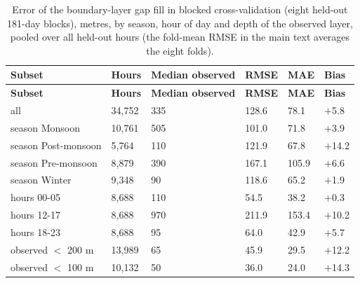 \begingroup\footnotesize
\begin{longtable}{L{4.4cm} C{1.4cm} C{2.0cm} C{1.4cm} C{1.4cm} C{1.4cm}}
\caption{Error of the boundary-layer gap fill in blocked cross-validation (eight held-out 181-day blocks), metres, by season, hour of day and depth of the observed layer, pooled over all held-out hours (the fold-mean RMSE in the main text averages the eight folds).}\label{tab:s-gapfill}\\
\toprule
\textbf{Subset} & \textbf{Hours} & \textbf{Median observed} & \textbf{RMSE} & \textbf{MAE} & \textbf{Bias} \\
\midrule\endfirsthead
\toprule
\textbf{Subset} & \textbf{Hours} & \textbf{Median observed} & \textbf{RMSE} & \textbf{MAE} & \textbf{Bias} \\
\midrule\endhead
\bottomrule\endfoot
all & 34,752 & 335 & 128.6 & 78.1 & $+$5.8 \\
season Monsoon & 10,761 & 505 & 101.0 & 71.8 & $+$3.9 \\
season Post-monsoon & 5,764 & 110 & 121.9 & 67.8 & $+$14.2 \\
season Pre-monsoon & 8,879 & 390 & 167.1 & 105.9 & $+$6.6 \\
season Winter & 9,348 & 90 & 118.6 & 65.2 & $+$1.9 \\
hours 00-05 & 8,688 & 110 & 54.5 & 38.2 & $+$0.3 \\
hours 12-17 & 8,688 & 970 & 211.9 & 153.4 & $+$10.2 \\
hours 18-23 & 8,688 & 95 & 64.0 & 42.9 & $+$5.7 \\
observed $<$ 200 m & 13,989 & 65 & 45.9 & 29.5 & $+$12.2 \\
observed $<$ 100 m & 10,132 & 50 & 36.0 & 24.0 & $+$14.3 \\
\end{longtable}
\endgroup

